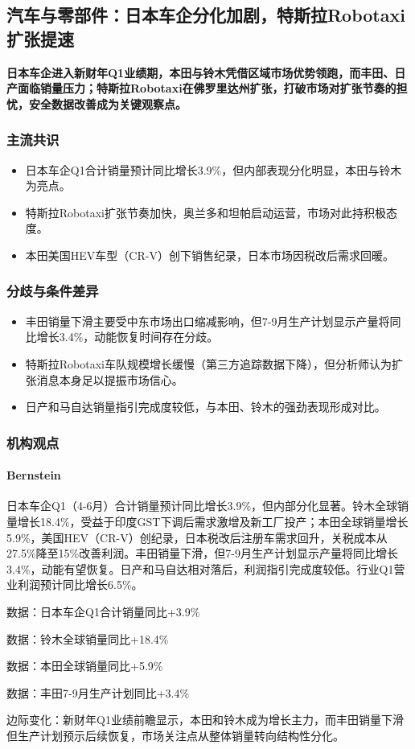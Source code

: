 \documentclass[11pt]{ctexart}
\begin{document}
\subsection{汽车与零部件：日本车企分化加剧，特斯拉Robotaxi扩张提速}
\textbf{日本车企进入新财年Q1业绩期，本田与铃木凭借区域市场优势领跑，而丰田、日产面临销量压力；特斯拉Robotaxi在佛罗里达州扩张，打破市场对扩张节奏的担忧，安全数据改善成为关键观察点。}
\subsubsection*{主流共识}
\begin{itemize}
  \item 日本车企Q1合计销量预计同比增长3.9\%，但内部表现分化明显，本田与铃木为亮点。
  \item 特斯拉Robotaxi扩张节奏加快，奥兰多和坦帕启动运营，市场对此持积极态度。
  \item 本田美国HEV车型（CR-V）创下销售纪录，日本市场因税改后需求回暖。
\end{itemize}
\subsubsection*{分歧与条件差异}
\begin{itemize}
  \item 丰田销量下滑主要受中东市场出口缩减影响，但7-9月生产计划显示产量将同比增长3.4\%，动能恢复时间存在分歧。
  \item 特斯拉Robotaxi车队规模增长缓慢（第三方追踪数据下降），但分析师认为扩张消息本身足以提振市场信心。
  \item 日产和马自达销量指引完成度较低，与本田、铃木的强劲表现形成对比。
\end{itemize}
\subsubsection*{机构观点}
\paragraph{Bernstein} 日本车企Q1（4-6月）合计销量预计同比增长3.9\%，但内部分化显著。铃木全球销量增长18.4\%，受益于印度GST下调后需求激增及新工厂投产；本田全球销量增长5.9\%，美国HEV（CR-V）创纪录，日本税改后注册车需求回升，关税成本从27.5\%降至15\%改善利润。丰田销量下滑，但7-9月生产计划显示产量将同比增长3.4\%，动能有望恢复。日产和马自达相对落后，利润指引完成度较低。行业Q1营业利润预计同比增长6.5\%。
{\small\color{refgray}数据：日本车企Q1合计销量同比+3.9\%\par}
{\small\color{refgray}数据：铃木全球销量同比+18.4\%\par}
{\small\color{refgray}数据：本田全球销量同比+5.9\%\par}
{\small\color{refgray}数据：丰田7-9月生产计划同比+3.4\%\par}
{\small\color{refgray}边际变化：新财年Q1业绩前瞻显示，本田和铃木成为增长主力，而丰田销量下滑但生产计划预示后续恢复，市场关注点从整体销量转向结构性分化。\par}
\end{document}
